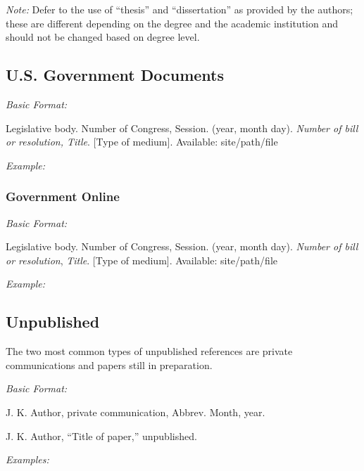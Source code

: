 \documentclass[10pt]{article}
\newcommand*{\guidelabel}[1]{\par\vspace{-4pt}\hspace*{22pt}\textit{#1}\par\vspace{-\parskip}}
\begin{document}
\textit{Note:} Defer to the use of “thesis” and “dissertation” as provided by the authors; these are different depending on the degree and the academic institution and should not be changed based on degree level.

\subsection{U.S. Government Documents}
\guidelabel{Basic Format:}
\begin{guideitems}
  \item Legislative body. Number of Congress, Session. (year, month day). \textit{Number of bill or resolution, Title}. [Type of medium]. Available: site/path/file
\end{guideitems}
\guidelabel{Example:}
\begin{guideitems}
  \item {}
\end{guideitems}

\subsubsection{Government Online}
\guidelabel{Basic Format:}
\begin{guideitems}
  \item Legislative body. Number of Congress, Session. (year, month day). \textit{Number of bill or resolution}, \textit{Title}. [Type of medium]. Available: site/path/file
\end{guideitems}
\guidelabel{Example:}
\begin{guideitems}
  \item {}
\end{guideitems}

\subsection{Unpublished}

The two most common types of unpublished references are private communications and papers still in preparation.

\guidelabel{Basic Format:}
\begin{guideitems}
  \item J. K. Author, private communication, Abbrev. Month, year.
  \item J. K. Author, “Title of paper,” unpublished.
\end{guideitems}
\guidelabel{Examples:}
\begin{guideitems}
  \item {}
  \item {}
  \item {}
\end{guideitems}
\end{document}
